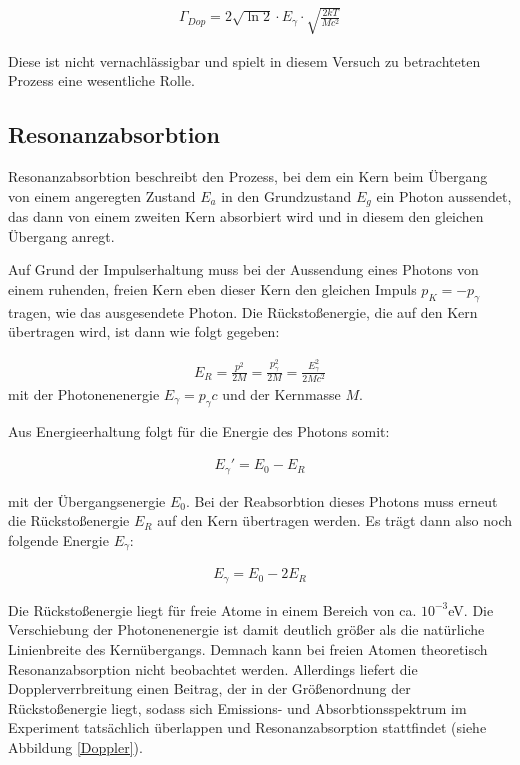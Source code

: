 \begin{align}
\Gamma_{Dop} = 2\sqrt{\ln2}\cdot E_{\gamma}\cdot\sqrt{\frac{2kT}{Mc^2}}
\end{align}

Diese ist nicht vernachlässigbar und spielt in diesem Versuch zu betrachteten Prozess eine wesentliche Rolle. \cite{jakobs}

\subsection{Resonanzabsorbtion}

Resonanzabsorbtion beschreibt den Prozess, bei dem ein Kern beim Übergang von einem angeregten Zustand  $E_a$ in den Grundzustand $E_g$ ein Photon aussendet, das dann von einem zweiten Kern absorbiert wird und in diesem den gleichen Übergang anregt. 

Auf Grund der Impulserhaltung muss bei der Aussendung eines Photons von einem ruhenden, freien Kern eben dieser Kern den gleichen Impuls  $p_K = -p_{\gamma}$ tragen, wie das ausgesendete Photon. Die Rückstoßenergie, die auf den Kern übertragen wird, ist dann wie folgt gegeben:

\begin{align}
E_R = \frac{p^2}{2M} = \frac{p_{\gamma}^2}{2M} = \frac{E_{\gamma}^2}{2Mc^2} \label{5}
\end{align}
 mit der Photonenenergie $E_{\gamma}=p_{\gamma}c$ und der Kernmasse $M$.

Aus Energieerhaltung folgt für die Energie des Photons somit:

\begin{align}
E_{\gamma}' = E_0 - E_R
\end{align}

mit der Übergangsenergie $E_0$. Bei der Reabsorbtion dieses Photons muss erneut die Rückstoßenergie $E_R$  auf den Kern übertragen werden. Es trägt dann also noch folgende Energie $E_{\gamma}$:

\begin{align}
E_{\gamma} = E_0-2E_R
\end{align}

Die Rückstoßenergie liegt für freie Atome in einem Bereich von ca.  $10^{-3}$eV. Die Verschiebung der Photonenenergie ist damit deutlich größer als die natürliche Linienbreite des Kernübergangs. Demnach kann bei freien Atomen theoretisch Resonanzabsorption nicht beobachtet werden. Allerdings liefert die Dopplerverrbreitung einen Beitrag, der in der Größenordnung der Rückstoßenergie liegt, sodass sich Emissions- und Absorbtionsspektrum im Experiment tatsächlich überlappen und Resonanzabsorption stattfindet (siehe Abbildung \ref{Doppler}).

